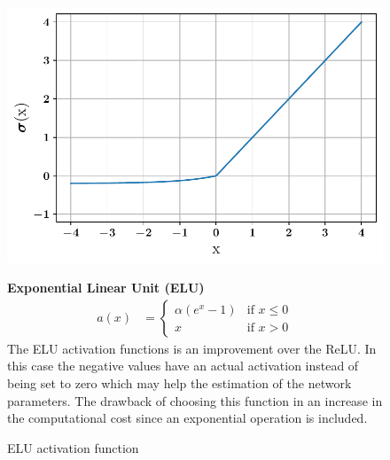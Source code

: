 \begin{figure}[!h]
\begin{minipage}{0.45\textwidth}
    \centering
\includegraphics[width=\textwidth]{images/networks/act_elu.pdf}
\caption{ELU activation function}
    \label{fig:elu}
\end{minipage}
\hfill
\begin{minipage}{0.5\textwidth}
    \textbf{Exponential Linear Unit (ELU)}
   \begin{align}
        a(x) &= 
        \begin{cases}
        \alpha \left(e^x -1\right)  & \text{if } x \leq 0 \\
        x  & \text{if } x > 0 
  \end{cases}
\end{align}
The ELU\cite{elu} activation functions is an improvement over the ReLU. In this case the negative values have an actual activation instead of being set to zero which may help the estimation of the network parameters. The drawback of choosing this function in an increase in the computational cost since an exponential operation is included. 
\end{minipage}
\end{figure}

